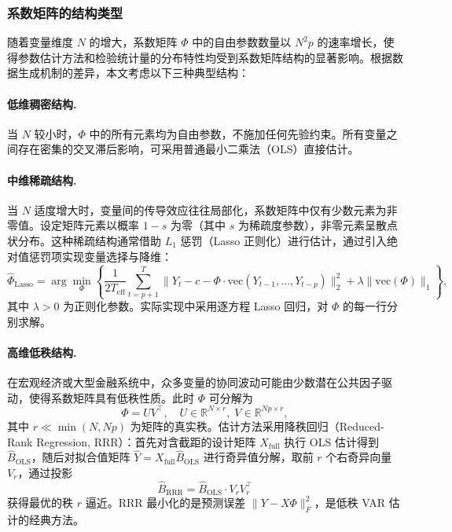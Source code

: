 \subsubsection{系数矩阵的结构类型}

随着变量维度 $N$ 的增大，系数矩阵 $\Phi$ 中的自由参数数量以 $N^2 p$ 的速率增长，使得参数估计方法和检验统计量的分布特性均受到系数矩阵结构的显著影响。根据数据生成机制的差异，本文考虑以下三种典型结构：

\paragraph{低维稠密结构.}
当 $N$ 较小时，$\Phi$ 中的所有元素均为自由参数，不施加任何先验约束。所有变量之间存在密集的交叉滞后影响，可采用普通最小二乘法（OLS）直接估计。

\paragraph{中维稀疏结构.}
当 $N$ 适度增大时，变量间的传导效应往往局部化，系数矩阵中仅有少数元素为非零值。设定矩阵元素以概率 $1 - s$ 为零（其中 $s$ 为稀疏度参数），非零元素呈散点状分布。这种稀疏结构通常借助 $L_1$ 惩罚（Lasso 正则化）进行估计，通过引入绝对值惩罚项实现变量选择与降维：
\begin{equation}\label{eq:lasso}
    \hat{\Phi}_{\text{Lasso}} = \arg\min_{\Phi} \left\{ \frac{1}{2T_{\text{eff}}} \sum_{t=p+1}^{T} \|Y_t - c - \Phi \cdot \mathrm{vec}(Y_{t-1}, \ldots, Y_{t-p})\|_2^2 + \lambda \|\mathrm{vec}(\Phi)\|_1 \right\},
\end{equation}
其中 $\lambda > 0$ 为正则化参数。实际实现中采用逐方程 Lasso 回归，对 $\Phi$ 的每一行分别求解。

\paragraph{高维低秩结构.}
在宏观经济或大型金融系统中，众多变量的协同波动可能由少数潜在公共因子驱动，使得系数矩阵具有低秩性质。此时 $\Phi$ 可分解为
\begin{equation}\label{eq:lowrank}
    \Phi = U V^\top, \quad U \in \mathbb{R}^{N \times r},\; V \in \mathbb{R}^{Np \times r},
\end{equation}
其中 $r \ll \min(N, Np)$ 为矩阵的真实秩。估计方法采用降秩回归（Reduced-Rank Regression, RRR）：首先对含截距的设计矩阵 $X_{\text{full}}$ 执行 OLS 估计得到 $\hat{B}_{\text{OLS}}$，随后对拟合值矩阵 $\hat{Y} = X_{\text{full}} \hat{B}_{\text{OLS}}$ 进行奇异值分解，取前 $r$ 个右奇异向量 $V_r$，通过投影
\begin{equation}\label{eq:rrr-proj}
    \hat{B}_{\text{RRR}} = \hat{B}_{\text{OLS}} \cdot V_r V_r^\top
\end{equation}
获得最优的秩 $r$ 逼近。RRR 最小化的是预测误差 $\|Y - X\Phi\|_F^2$，是低秩 VAR 估计的经典方法。

